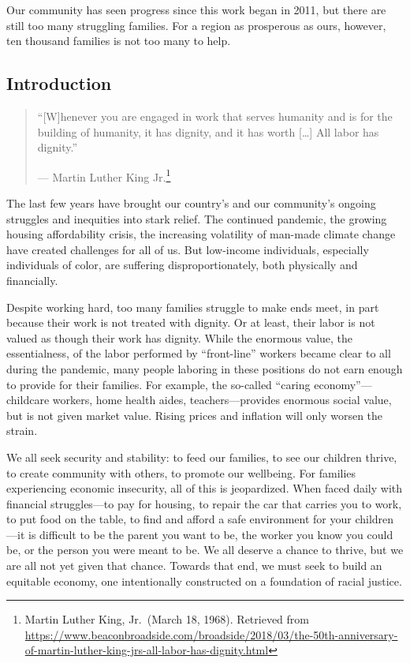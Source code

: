 \documentclass[
]{article}
\begin{document}
Our community has seen progress since this work began in 2011, but there
are still too many struggling families. For a region as prosperous as
ours, however, ten thousand families is not too many to help.

\hypertarget{introduction}{%
\subsection{Introduction}\label{introduction}}

\begin{quote}
``{[}W{]}henever you are engaged in work that serves humanity and is for
the building of humanity, it has dignity, and it has worth {[}\ldots{]}
All labor has dignity.''

--- Martin Luther King Jr.\footnote{Martin Luther King, Jr.~(March 18,
  1968). Retrieved from
  \url{https://www.beaconbroadside.com/broadside/2018/03/the-50th-anniversary-of-martin-luther-king-jrs-all-labor-has-dignity.html}}
\end{quote}

The last few years have brought our country's and our community's
ongoing struggles and inequities into stark relief. The continued
pandemic, the growing housing affordability crisis, the increasing
volatility of man-made climate change have created challenges for all of
us. But low-income individuals, especially individuals of color, are
suffering disproportionately, both physically and financially.

Despite working hard, too many families struggle to make ends meet, in
part because their work is not treated with dignity. Or at least, their
labor is not valued as though their work has dignity. While the enormous
value, the essentialness, of the labor performed by ``front-line''
workers became clear to all during the pandemic, many people laboring in
these positions do not earn enough to provide for their families. For
example, the so-called ``caring economy''---childcare workers, home
health aides, teachers---provides enormous social value, but is not
given market value. Rising prices and inflation will only worsen the
strain.

We all seek security and stability: to feed our families, to see our
children thrive, to create community with others, to promote our
wellbeing. For families experiencing economic insecurity, all of this is
jeopardized. When faced daily with financial struggles---to pay for
housing, to repair the car that carries you to work, to put food on the
table, to find and afford a safe environment for your children---it is
difficult to be the parent you want to be, the worker you know you could
be, or the person you were meant to be. We all deserve a chance to
thrive, but we are all not yet given that chance. Towards that end, we
must seek to build an equitable economy, one intentionally constructed
on a foundation of racial justice.
\end{document}
